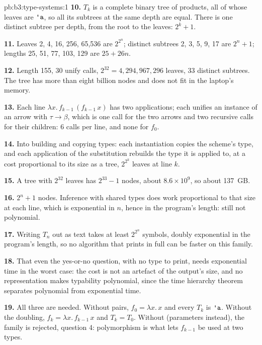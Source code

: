 \begin{solution}{pb:b3:type-systems:1}
\textbf{10.} $T_k$ is a complete binary tree of products, all of whose leaves are $\text{\ttfamily\textquotesingle a}$, so all its subtrees at the same depth are equal. There is one distinct subtree per depth, from the root to the leaves: $2^k + 1$.

\textbf{11.} Leaves 2, 4, 16, 256, 65,536 are $2^{2^n}$; distinct subtrees 2, 3, 5, 9, 17 are $2^n + 1$; lengths 25, 51, 77, 103, 129 are $25 + 26n$.

\textbf{12.} Length 155, 30 unify calls, $2^{32} = 4{,}294{,}967{,}296$ leaves, 33 distinct subtrees. The tree has more than eight billion nodes and does not fit in the laptop's memory.

\textbf{13.} Each line $\lambda x.\,f_{k-1}\,(f_{k-1}\,x)$ has two applications; each unifies an instance of an arrow with $\tau \to \beta$, which is one call for the two arrows and two recursive calls for their children: 6 calls per line, and none for $f_0$.

\textbf{14.} Into building and copying types: each instantiation copies the scheme's type, and each application of the substitution rebuilds the type it is applied to, at a cost proportional to its size as a tree, $2^{2^k}$ leaves at line $k$.

\textbf{15.} A tree with $2^{32}$ leaves has $2^{33} - 1$ nodes, about $8.6 \times 10^9$, so about 137~GB.

\textbf{16.} $2^n + 1$ nodes. Inference with shared types does work proportional to that size at each line, which is exponential in $n$, hence in the program's length: still not polynomial.

\textbf{17.} Writing $T_n$ out as text takes at least $2^{2^n}$ symbols, doubly exponential in the program's length, so no algorithm that prints  in full can be faster on this family.

\textbf{18.} That even the yes-or-no question, with no type to print, needs exponential time in the worst case: the cost is not an artefact of the output's size, and no representation makes typability polynomial, since the time hierarchy theorem separates polynomial from exponential time.

\textbf{19.} All three are needed. Without pairs, $f_0 = \lambda x.\,x$ and every $T_k$ is $\text{\ttfamily\textquotesingle a}$. Without the doubling, $f_k = \lambda x.\,f_{k-1}\,x$ and $T_k = T_0$. Without  (parameters instead), the family is rejected, question 4: polymorphism is what lets $f_{k-1}$ be used at two types.


\end{solution}
